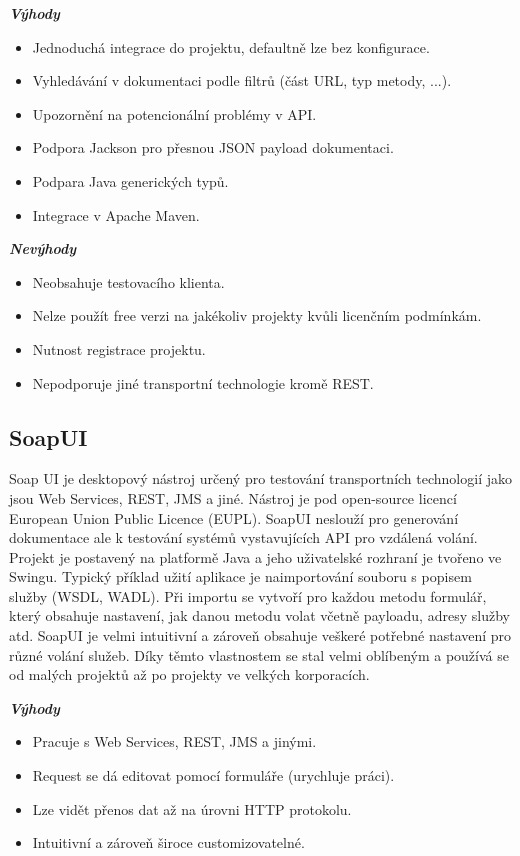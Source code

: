 \documentclass[11pt,twoside,a4paper]{book}
\begin{document}
\textbf{\textit{Výhody}}

\begin{itemize}
  \item Jednoduchá integrace do projektu, defaultně lze bez konfigurace.
  \item Vyhledávání v dokumentaci podle filtrů (část URL, typ metody, ...).
  \item Upozornění na potencionální problémy v API.
  \item Podpora Jackson pro přesnou JSON payload dokumentaci.
  \item Podpara Java generických typů.
  \item Integrace v Apache Maven.
\end{itemize}

\textbf{\textit{Nevýhody}}

\begin{itemize}
  \item Neobsahuje testovacího klienta.
  \item Nelze použít free verzi na jakékoliv projekty kvůli licenčním podmínkám.
  \item Nutnost registrace projektu.
  \item Nepodporuje jiné transportní technologie kromě REST.
\end{itemize}

\subsection{SoapUI}

Soap UI je desktopový nástroj určený pro testování transportních technologií jako jsou Web
Services, REST, JMS a jiné. Nástroj je pod open-source licencí European Union Public
Licence (EUPL). SoapUI neslouží pro generování dokumentace ale k testování systémů
vystavujících API pro vzdálená volání. Projekt je postavený na platformě Java a jeho
uživatelské rozhraní je tvořeno ve Swingu. Typický příklad užití aplikace je naimportování
souboru s popisem služby (WSDL, WADL). Při importu se vytvoří pro každou metodu
formulář, který obsahuje nastavení, jak danou metodu volat včetně payloadu, adresy služby
atd. SoapUI je velmi intuitivní a zároveň obsahuje veškeré potřebné nastavení pro různé
volání služeb. Díky těmto vlastnostem se stal velmi oblíbeným a používá se od malých
projektů až po projekty ve velkých korporacích.

\textbf{\textit{Výhody}}

\begin{itemize}
  \item Pracuje s Web Services, REST, JMS a jinými.
  \item Request se dá editovat pomocí formuláře (urychluje práci).
  \item Lze vidět přenos dat až na úrovni HTTP protokolu.
  \item Intuitivní a zároveň široce customizovatelné.
\end{itemize}
\end{document}
